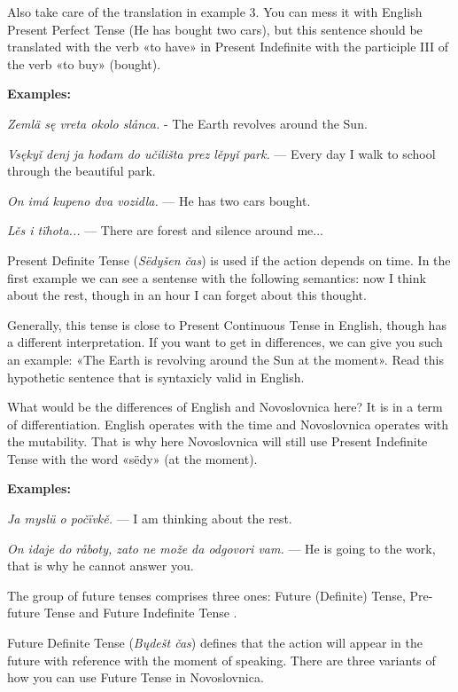 Also take care of the translation in example 3. You can mess it with English Present Perfect Tense (He has bought two cars), but this sentence should be translated with the verb «to have» in Present Indefinite with the participle III of the verb «to buy» (bought).

\textbf{Examples:}

\textit{Zemlä sę vreta okolo slånca.} - The Earth revolves around the Sun.

\textit{Vsękyǐ denj ja hođam do učilišta prez lěpyǐ park.} — Every day I walk to school through the beautiful park.

\textit{On imá kupeno dva vozidla.} — He has two cars bought.

\textit{Lěs i tïhota...} — There are forest and silence around me...

Present Definite Tense (\textit{Sëdyšen čas}) is used if the action depends on time. In the first example we can see a sentense with the following semantics: now I think about the rest, though in an hour I can forget about this thought.

Generally, this tense is close to Present Continuous Tense in English, though has a different interpretation. If you want to get in differences, we can give you such an example: «The Earth is revolving around the Sun at the moment». Read this hypothetic sentence that is syntaxicly valid in English.

What would be the differences of English and Novoslovnica here? It is in a term of differentiation. English operates with the time and Novoslovnica operates with the mutability. That is why here Novoslovnica will still use Present Indefinite Tense with the word «sëdy» (at the moment).

\textbf{Examples:}

\textit{Ja myslü o počïvkě.} — I am thinking about the rest.

\textit{On idaje do råboty, zato ne može da odgovori vam.} — He is going to the work, that is why he cannot answer you.

The group of future tenses comprises three ones: Future (Definite) Tense, Pre-future Tense and Future Indefinite Tense \cite{future-semantic}.

Future Definite Tense (\textit{Bųdešt čas}) defines that the action will appear in the future with reference with the moment of speaking. There are three variants of how you can use Future Tense in Novoslovnica.

